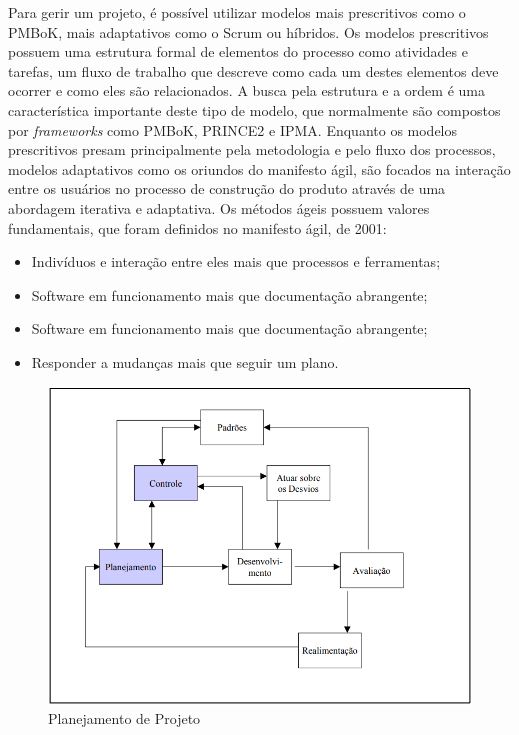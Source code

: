 Para gerir um projeto, é possível utilizar modelos mais prescritivos como o PMBoK, mais adaptativos como o Scrum ou híbridos.
Os modelos prescritivos possuem uma estrutura formal de elementos do processo como atividades e tarefas, um fluxo de trabalho que descreve como cada um destes elementos deve ocorrer e como eles são relacionados. A busca pela estrutura e a ordem é uma característica importante deste tipo de modelo, que normalmente são compostos por \textit{frameworks} como PMBoK, PRINCE2 e IPMA\cite{Julia_Mara_2018}.
Enquanto os modelos prescritivos presam principalmente pela metodologia e pelo fluxo dos processos, modelos adaptativos como os oriundos do manifesto ágil, são focados na interação entre os usuários no processo de construção do produto através de uma abordagem iterativa e adaptativa\cite{Julia_Mara_2018}.
Os métodos ágeis possuem valores fundamentais, que foram definidos no manifesto ágil, de 2001:
\begin{itemize}
	\item Indivíduos e interação entre eles mais que processos e ferramentas;
	\item Software em funcionamento mais que documentação abrangente;
	\item Software em funcionamento mais que documentação abrangente;
	\item Responder a mudanças mais que seguir um plano.
\end{itemize}

\begin{figure}[htb]
	\caption{\label{planejamento_21}Planejamento de Projeto}
	\begin{center}
		\includegraphics[scale=0.45]{./Figuras/planejamento_projeto.png}
	\end{center}
\end{figure}

